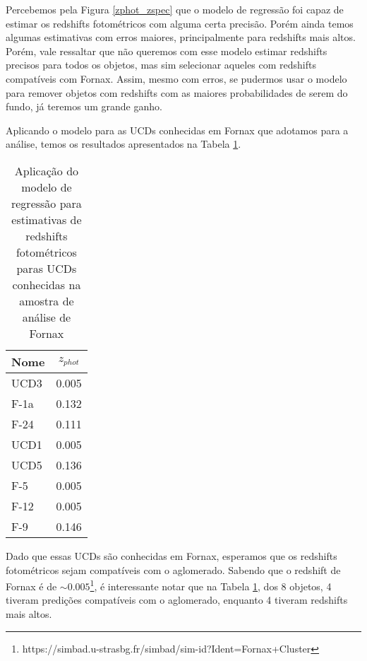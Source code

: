 \vspace{\baselineskip}

Percebemos pela Figura \ref{zphot_zspec} que o modelo de regressão foi capaz de estimar os redshifts fotométricos com alguma certa precisão. Porém ainda temos algumas estimativas com erros maiores, principalmente para redshifts mais altos. Porém, vale ressaltar que não queremos com esse modelo estimar redshifts precisos para todos os objetos, mas sim selecionar aqueles com redshifts compatíveis com Fornax. Assim, mesmo com erros, se pudermos usar o modelo para remover objetos com redshifts com as maiores probabilidades de serem do fundo, já teremos um grande ganho.

\vspace{\baselineskip}

Aplicando o modelo para as UCDs conhecidas em Fornax que adotamos para a análise, temos os resultados apresentados na Tabela \ref{ucds_zphot}.

\begin{table}[!ht]
    \centering
    \caption{Aplicação do modelo de regressão para estimativas de redshifts fotométricos paras UCDs conhecidas na amostra de análise de Fornax}
    \begin{tabular}{lc}
        \toprule
        Nome & \textit{$z_{phot}$}   \\
        \midrule
        UCD3 & 0.005 \\
        F-1a & 0.132 \\
        F-24 & 0.111 \\
        UCD1 & 0.005 \\
        UCD5 & 0.136 \\
        F-5 & 0.005 \\
        F-12 & 0.005 \\
        F-9 & 0.146 \\
        \midrule
    \end{tabular}
    \label{ucds_zphot}
\end{table}

Dado que essas UCDs são conhecidas em Fornax, esperamos que os redshifts fotométricos sejam compatíveis com o aglomerado. Sabendo que o redshift de Fornax é de $\sim 0.005$\footnote{https://simbad.u-strasbg.fr/simbad/sim-id?Ident=Fornax+Cluster}, é interessante notar que na Tabela \ref{ucds_zphot}, dos 8 objetos, 4 tiveram predições compatíveis com o aglomerado, enquanto 4 tiveram redshifts mais altos. 

\vspace{\baselineskip}


